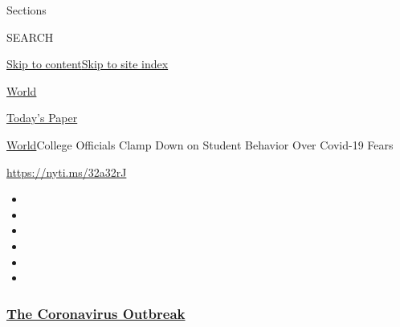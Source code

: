 Sections

SEARCH

\protect\hyperlink{site-content}{Skip to
content}\protect\hyperlink{site-index}{Skip to site index}

\href{https://www.nytimes3xbfgragh.onion/section/world}{World}

\href{https://myaccount.nytimes3xbfgragh.onion/auth/login?response_type=cookie\&client_id=vi}{}

\href{https://www.nytimes3xbfgragh.onion/section/todayspaper}{Today's
Paper}

\href{/section/world}{World}\textbar{}College Officials Clamp Down on
Student Behavior Over Covid-19 Fears

\url{https://nyti.ms/32a32rJ}

\begin{itemize}
\item
\item
\item
\item
\item
\item
\end{itemize}

\hypertarget{the-coronavirus-outbreak}{%
\subsubsection{\texorpdfstring{\href{https://www.nytimes3xbfgragh.onion/news-event/coronavirus?name=styln-coronavirus-national\&region=TOP_BANNER\&variant=undefined\&block=storyline_menu_recirc\&action=click\&pgtype=Article\&impression_id=4c24c300-e383-11ea-81b0-ed0ce085a510}{The
Coronavirus
Outbreak}}{The Coronavirus Outbreak}}\label{the-coronavirus-outbreak}}


